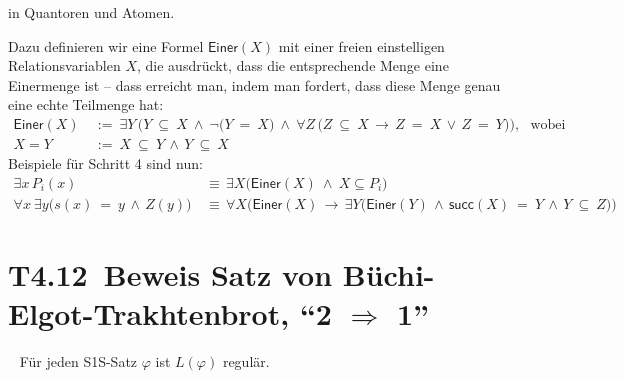 \documentclass[fontsize=11pt, twoside=false, numbers=autoenddot]{scrbook}
\begin{document}
\begin{beweis}
  \par\medskip\noindent
   in Quantoren und Atomen.

  Dazu definieren wir eine Formel $\textsf{Einer}(X)$ mit einer freien einstelligen Relationsvariablen $X$,
  die ausdrückt, dass die entsprechende Menge eine Einermenge ist -- dass erreicht man, indem man fordert,
  dass diese Menge genau eine echte Teilmenge hat:
  \begin{align*}
    \textsf{Einer}(X) & ~:=~ \exists Y\,\Big(Y \!\!\:\subseteq\!\!\: X ~\land~ \lnot\big(Y \!\!\:=\!\!\: X) ~\land~ 
                                            \forall Z\,\big(Z \!\!\:\subseteq\!\!\: X \,\to\, Z \!\!\:=\!\!\: X \,\lor\, Z \!\!\:=\!\!\: Y)\Big), \text{~~wobei}\\
    X=Y               & ~:=~ X \!\!\:\subseteq\!\!\: Y \,\land\, Y \!\!\:\subseteq\!\!\: X
  \end{align*}
  Beispiele für Schritt 4 sind nun:
  \begin{align*}
    \exists x\,P_i(x) & \,\equiv\, \exists X\Big(\textsf{Einer}(X) ~\land~ X \subseteq P_i\Big) \\
    \forall x\:\!\exists y \Big(s(x) \!\!\:=\!\!\: y \,\land\, Z(y)\Big)
                      & \,\equiv\, \forall X\bigg(\textsf{Einer}(X) \,\to\, \exists Y\Big(\textsf{Einer}(Y) \,\land\, \textsf{succ}(X) \!\!\:=\!\!\: Y \,\land\, Y \!\!\:\subseteq\!\!\: Z\Big)\bigg)
  \end{align*}
  \quasiqedhere
\end{beweis}%
\goodbreak

\section*{T4.12~Beweis Satz von Büchi-Elgot-Trakhtenbrot, {\boldmath "`2 $\Rightarrow$ 1"'}}

~ Für jeden S1S-Satz $\varphi$ ist $L(\varphi)$ regulär.
\end{document}
